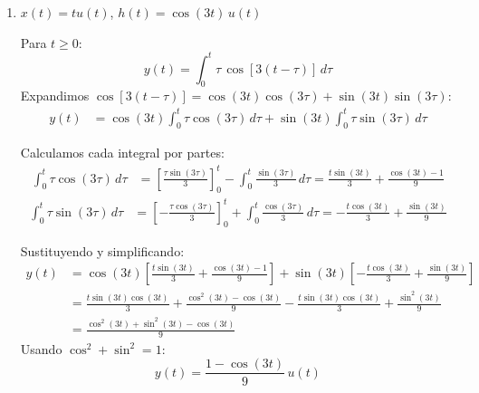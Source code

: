 \documentclass[10pt,a4paper]{article}
\begin{document}
\begin{enumerate}[label=\textbf{\alph*)}]
		Multiplicando por $e^{-2t}$:
		\[
		\boxed{y(t) = \frac{1}{4}\left(2t + 1 - e^{-2t}\right)u(t)}
		\]
		
		\begin{figure}[H]
		\centering
		
		\caption{Inciso~b). Arriba: entrada $x(t) = (t+1)\,u(t)$ (azul) y respuesta al impulso $h(t) = e^{-2t}\,u(t)$ (rojo); cada panel con su escala propia. Abajo: salida $y(t) = \tfrac{1}{4}(2t+1-e^{-2t})\,u(t)$, que crece asintóticamente con pendiente $1/2$ siguiendo la recta $(2t+1)/4$ (gris).}
		\end{figure}
		
		\item $x(t) = tu(t)$, $h(t) = \cos(3t)\,u(t)$
		
		Para $t \geq 0$:
		\[
		y(t) = \int_0^t \tau\,\cos[3(t-\tau)]\,d\tau
		\]
		Expandimos $\cos[3(t-\tau)] = \cos(3t)\cos(3\tau) + \sin(3t)\sin(3\tau)$:
		\begin{align*}
		y(t) &= \cos(3t)\int_0^t \tau\cos(3\tau)\,d\tau + \sin(3t)\int_0^t \tau\sin(3\tau)\,d\tau
		\end{align*}
		
		Calculamos cada integral por partes:
		\begin{align*}
		\int_0^t \tau\cos(3\tau)\,d\tau &= \left[\frac{\tau\sin(3\tau)}{3}\right]_0^t - \int_0^t \frac{\sin(3\tau)}{3}\,d\tau = \frac{t\sin(3t)}{3} + \frac{\cos(3t) - 1}{9}
		\end{align*}
		\begin{align*}
		\int_0^t \tau\sin(3\tau)\,d\tau &= \left[-\frac{\tau\cos(3\tau)}{3}\right]_0^t + \int_0^t \frac{\cos(3\tau)}{3}\,d\tau = -\frac{t\cos(3t)}{3} + \frac{\sin(3t)}{9}
		\end{align*}
		
		Sustituyendo y simplificando:
		\begin{align*}
		y(t) &= \cos(3t)\left[\frac{t\sin(3t)}{3} + \frac{\cos(3t)-1}{9}\right] + \sin(3t)\left[-\frac{t\cos(3t)}{3} + \frac{\sin(3t)}{9}\right] \\
		&= \frac{t\sin(3t)\cos(3t)}{3} + \frac{\cos^2(3t)-\cos(3t)}{9} - \frac{t\sin(3t)\cos(3t)}{3} + \frac{\sin^2(3t)}{9} \\
		&= \frac{\cos^2(3t) + \sin^2(3t) - \cos(3t)}{9}
		\end{align*}
		Usando $\cos^2 + \sin^2 = 1$:
		\[
		\boxed{y(t) = \frac{1 - \cos(3t)}{9}\,u(t)}
		\]


\end{enumerate}
\end{document}
